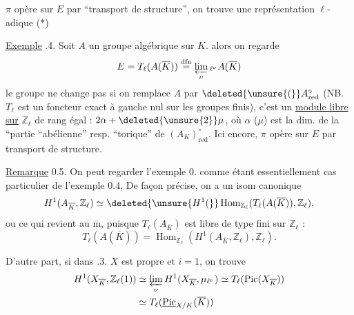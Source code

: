  \(\pi\) opère sur  \(E\) par ``transport de structure'', on trouve une représentation \(\ell\)-adique (*)

\uline{Exemple} .4. Soit \(A\) un  groupe algébrique  sur \(K\).  alors on regarde
\[
E=T_\ell(A(\overline K))\overset{\mathrm{dfn}}{=}\varprojlim_{\nu}{}_{\ell^\nu}A(\overline K)
\]
 le groupe ne change pas si on remplace \(A\) par \(\deleted{\unsure{(}}A^\circ_{\mathrm{red}}\) (NB. \(T_\ell\) est un foncteur exact à gauche nul sur les groupes finis), c'est un  \uline{module libre sur} \(\mathbb Z_\ell\) de rang égal : \(2\alpha+\deleted{\unsure{2}}\mu\), où \(\alpha\) (\(\mu\)) est la dim. de la ``partie ``abélienne'' resp.  ``torique'' de \((A_K)^\circ_{\mathrm{red}}\). Ici encore, \(\pi\) opère sur \(E\) par transport de structure.

\uline{Remarque} 0.5. On peut regarder l'exemple 0. comme étant essentiellement   cas particulier de l'exemple 0.4,  De façon précise, on a un isom canonique
\[
H^1(A_{\overline K},\mathbb Z_\ell)\simeq\deleted{\unsure{H^1(}}\operatorname{Hom}_{\mathbb Z_\ell}(T_\ell(A(\overline K)),\mathbb Z_\ell),
\]
ou ce qui revient au \(\overline{\mathrm m}\), puisque \(T_\ell(A_{\overline K})\) est libre de type fini sur \(\mathbb Z_\ell\) :
\[
T_\ell(A(\overline K))=\operatorname{Hom}_{\mathbb Z_\ell}(H^1(A_{\overline K},\mathbb Z_\ell),\mathbb Z_\ell).
\]

D'autre part,  si  dans .3. \(X\) est propre et \(i=1\), on trouve
\[
\begin{aligned}
H^1(X_{\overline K},\mathbb Z_\ell(1))&\simeq\varprojlim_\nu H^1(X_{\overline K},\mu_{\ell^\nu})\simeq T_\ell(\operatorname{Pic}(X_{\overline K}))\\
&\simeq T_\ell(\underline{\operatorname{Pic}}_{X/K}(\overline K))
\end{aligned}
\]
